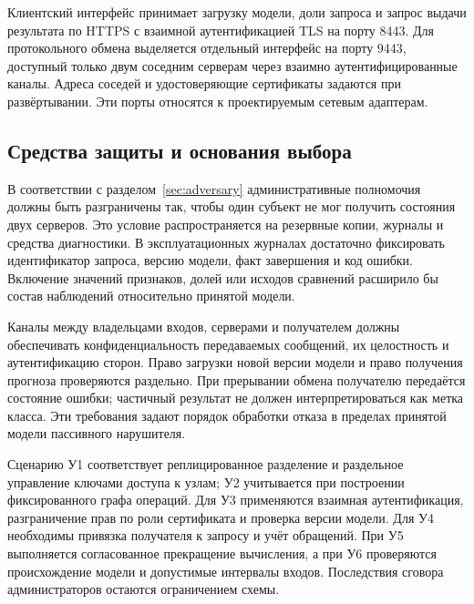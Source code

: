 Клиентский интерфейс принимает загрузку модели, доли запроса и запрос выдачи результата по HTTPS с взаимной аутентификацией TLS на порту 8443. Для протокольного обмена выделяется отдельный интерфейс на порту 9443, доступный только двум соседним серверам через взаимно аутентифицированные каналы. Адреса соседей и удостоверяющие сертификаты задаются при развёртывании. Эти порты относятся к проектируемым сетевым адаптерам.

\subsection{Средства защиты и основания выбора}

В соответствии с разделом~\ref{sec:adversary} административные полномочия
должны быть разграничены так, чтобы один субъект не мог получить состояния
двух серверов. Это условие распространяется на резервные копии, журналы и
средства диагностики. В эксплуатационных журналах достаточно фиксировать
идентификатор запроса, версию модели, факт завершения и код ошибки.
Включение значений признаков, долей или исходов сравнений расширило бы
состав наблюдений относительно принятой модели.

Каналы между владельцами входов, серверами и получателем должны
обеспечивать конфиденциальность передаваемых сообщений, их целостность
и аутентификацию сторон. Право загрузки новой версии модели и право
получения прогноза проверяются раздельно. При прерывании обмена получателю
передаётся состояние ошибки; частичный результат не должен
интерпретироваться как метка класса. Эти требования задают порядок
обработки отказа в пределах принятой модели пассивного нарушителя.

Сценарию У1 соответствует реплицированное разделение и раздельное управление ключами доступа к узлам; У2 учитывается при построении фиксированного графа операций. Для У3 применяются взаимная аутентификация, разграничение прав по роли сертификата и проверка версии модели. Для У4 необходимы привязка получателя к запросу и учёт обращений. При У5 выполняется согласованное прекращение вычисления, а при У6 проверяются происхождение модели и допустимые интервалы входов. Последствия сговора администраторов остаются ограничением схемы.
